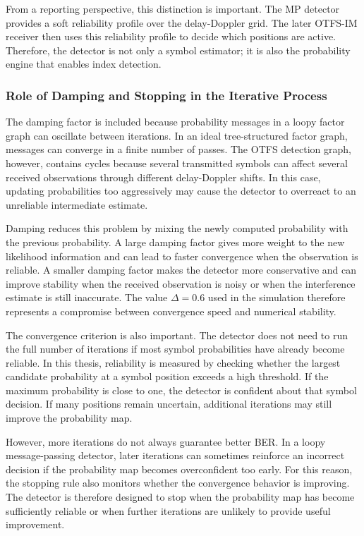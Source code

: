 From a reporting perspective, this distinction is important. The MP detector provides a soft reliability profile over the delay-Doppler grid. The later OTFS-IM receiver then uses this reliability profile to decide which positions are active. Therefore, the detector is not only a symbol estimator; it is also the probability engine that enables index detection.

\subsubsection{Role of Damping and Stopping in the Iterative Process}

The damping factor is included because probability messages in a loopy factor graph can oscillate between iterations. In an ideal tree-structured factor graph, messages can converge in a finite number of passes. The OTFS detection graph, however, contains cycles because several transmitted symbols can affect several received observations through different delay-Doppler shifts. In this case, updating probabilities too aggressively may cause the detector to overreact to an unreliable intermediate estimate.

Damping reduces this problem by mixing the newly computed probability with the previous probability. A large damping factor gives more weight to the new likelihood information and can lead to faster convergence when the observation is reliable. A smaller damping factor makes the detector more conservative and can improve stability when the received observation is noisy or when the interference estimate is still inaccurate. The value \(\Delta=0.6\) used in the simulation therefore represents a compromise between convergence speed and numerical stability.

The convergence criterion is also important. The detector does not need to run the full number of iterations if most symbol probabilities have already become reliable. In this thesis, reliability is measured by checking whether the largest candidate probability at a symbol position exceeds a high threshold. If the maximum probability is close to one, the detector is confident about that symbol decision. If many positions remain uncertain, additional iterations may still improve the probability map.

However, more iterations do not always guarantee better BER. In a loopy message-passing detector, later iterations can sometimes reinforce an incorrect decision if the probability map becomes overconfident too early. For this reason, the stopping rule also monitors whether the convergence behavior is improving. The detector is therefore designed to stop when the probability map has become sufficiently reliable or when further iterations are unlikely to provide useful improvement.

